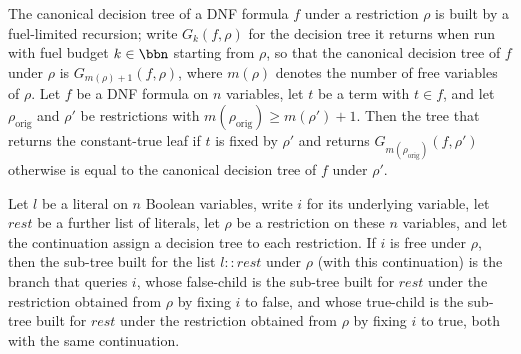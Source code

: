 \begin{lemma}
\label{SwitchingLemma.cont_eq_canonicalDTree}
\leanok
{}
The canonical decision tree of a DNF formula $f$ under a restriction $\rho$ is built by
a fuel-limited recursion; write $G_k(f,\rho)$ for the decision tree it returns when run
with fuel budget $k \in \bbn$ starting from $\rho$, so that the canonical decision tree
of $f$ under $\rho$ is $G_{m(\rho)+1}(f,\rho)$, where $m(\rho)$ denotes the number of
free variables of $\rho$. Let $f$ be a DNF formula on $n$ variables, let $t$ be a term
with $t \in f$, and let $\rho_{\mathrm{orig}}$ and $\rho'$ be restrictions with
$m(\rho_{\mathrm{orig}}) \ge m(\rho') + 1$. Then the tree that returns the constant-true
leaf if $t$ is fixed by $\rho'$ and returns $G_{m(\rho_{\mathrm{orig}})}(f,\rho')$
otherwise is equal to the canonical decision tree of $f$ under $\rho'$.
\end{lemma}

\begin{lemma}
\label{SwitchingLemma.termSubTree_cons_free}
\leanok
{}
Let $l$ be a literal on $n$ Boolean variables, write $i$ for its underlying variable,
let $\mathit{rest}$ be a further list of literals, let $\rho$ be a restriction on these
$n$ variables, and let the continuation assign a decision tree to each restriction. If
$i$ is free under $\rho$, then the sub-tree built for the list $l :: \mathit{rest}$
under $\rho$ (with this continuation) is the branch that queries $i$, whose false-child
is the sub-tree built for $\mathit{rest}$ under the restriction obtained from $\rho$ by
fixing $i$ to false, and whose true-child is the sub-tree built for $\mathit{rest}$
under the restriction obtained from $\rho$ by fixing $i$ to true, both with the same
continuation.
\end{lemma}

